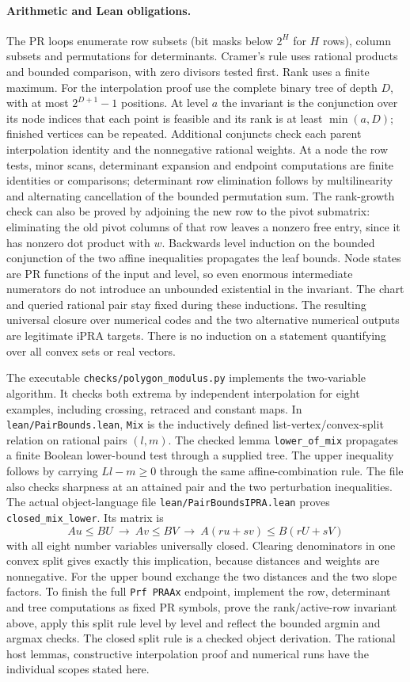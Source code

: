 \paragraph{Arithmetic and Lean obligations.}
The PR loops enumerate row subsets (bit masks below $2^H$ for $H$ rows), column subsets and permutations for determinants. Cramer's rule uses rational products and bounded comparison, with zero divisors tested first. Rank uses a finite maximum. For the interpolation proof use the complete binary tree of depth $D$, with at most $2^{D+1}-1$ positions. At level $a$ the invariant is the conjunction over its node indices that each point is feasible and its rank is at least $\min(a,D)$; finished vertices can be repeated. Additional conjuncts check each parent interpolation identity and the nonnegative rational weights. At a node the row tests, minor scans, determinant expansion and endpoint computations are finite identities or comparisons; determinant row elimination follows by multilinearity and alternating cancellation of the bounded permutation sum. The rank-growth check can also be proved by adjoining the new row to the pivot submatrix: eliminating the old pivot columns of that row leaves a nonzero free entry, since it has nonzero dot product with $w$. Backwards level induction on the bounded conjunction of the two affine inequalities propagates the leaf bounds. Node states are PR functions of the input and level, so even enormous intermediate numerators do not introduce an unbounded existential in the invariant. The chart and queried rational pair stay fixed during these inductions. The resulting universal closure over numerical codes and the two alternative numerical outputs are legitimate iPRA targets. There is no induction on a statement quantifying over all convex sets or real vectors.

The executable \texttt{checks/polygon\_modulus.py} implements the two-variable algorithm. It checks both extrema by independent interpolation for eight examples, including crossing, retraced and constant maps. In \texttt{lean/PairBounds.lean}, \texttt{Mix} is the inductively defined list-vertex/convex-split relation on rational pairs $(l,m)$. The checked lemma \texttt{lower\_of\_mix} propagates a finite Boolean lower-bound test through a supplied tree. The upper inequality follows by carrying $L l-m\ge0$ through the same affine-combination rule. The file also checks sharpness at an attained pair and the two perturbation inequalities. The actual object-language file \texttt{lean/PairBoundsIPRA.lean} proves \texttt{closed\_mix\_lower}. Its matrix is
\[
 Au\le BU\ \longrightarrow\ Av\le BV\ \longrightarrow\
 A(ru+sv)\le B(rU+sV)
\]
with all eight number variables universally closed. Clearing denominators in one convex split gives exactly this implication, because distances and weights are nonnegative. For the upper bound exchange the two distances and the two slope factors. To finish the full \texttt{Prf PRAAx} endpoint, implement the row, determinant and tree computations as fixed PR symbols, prove the rank/active-row invariant above, apply this split rule level by level and reflect the bounded argmin and argmax checks. The closed split rule is a checked object derivation. The rational host lemmas, constructive interpolation proof and numerical runs have the individual scopes stated here.
